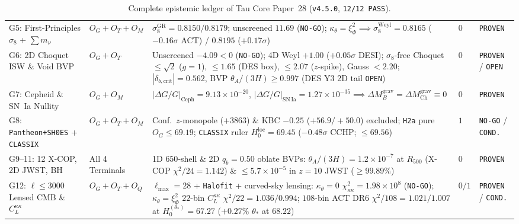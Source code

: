 \documentclass[11pt,a4paper]{article}
\begin{document}
\begin{table}[htbp]
{\begin{tabular}{ll>{\raggedright\arraybackslash}p{6.0cm}ll}
G5: First-Principles $\sigma_8$ + $\sum m_\nu$ & $O_G + O_T + O_M$ & $\sigma_8^{\mathrm{GR}} = 0.8150 / 0.8179$; unscreened $11.69$ ({\upshape\texttt{NO-GO}}); $\kappa_\theta = \xi_\Phi^2 \implies \sigma_8^{\mathrm{Weyl}} = 0.8165$ ($-0.16\sigma$ ACT) / $0.8195$ ($+0.17\sigma$) & $0$ & {\upshape\texttt{PROVEN}} \\
G6: 2D Choquet ISW \& Void BVP & $O_G + O_T$ & Unscreened $-4.09 < 0$ ({\upshape\texttt{NO-GO}}); 4D Weyl $+1.00$ ($+0.05\sigma$ DESI); $\sigma_8$-free Choquet $\le \sqrt{2}$ ($g{=}1$), $\le 1.65$ (DES box), $\le 2.07$ ($z$-spike), Gauss $< 2.20$; $|\delta_{b,\mathrm{crit}}| = 0.562$, BVP $\theta_A/(3H) \ge 0.997$ (DES Y3 2D tail {\upshape\texttt{OPEN}}) & $0$ & {\upshape\texttt{PROVEN}} / {\upshape\texttt{OPEN}} \\
G7: Cepheid \& SN~Ia Nullity & $O_G + O_M$ & $|\Delta G/G|_{\mathrm{Ceph}} = 9.13\times 10^{-20}$, $|\Delta G/G|_{\mathrm{SN\,Ia}} = 1.27\times 10^{-35} \implies \Delta M_B^{\mathrm{grav}} = \Delta M_{\mathrm{Ch}}^{\mathrm{grav}} \equiv 0$ & $0$ & {\upshape\texttt{PROVEN}} \\
G8: \texttt{Pantheon+SH0ES} + \texttt{CLASSIX} & $O_G + O_T + O_M$ & Conf.\ $z$-monopole ($+3863$) \& KBC $-0.25$ ($+56.9 / +50.0$) excluded; \texttt{H2a} pure $O_G \le 69.19$; \texttt{CLASSIX} ruler $H_0^{\mathrm{loc}} = 69.45$ ($-0.48\sigma$ CCHP; $\le 69.56$) & $1$ & {\upshape\texttt{NO-GO}} / {\upshape\texttt{COND.}} \\
G9--11: 12 X-COP, 2D JWST, BH & All 4 Terminals & 1D $650$-shell \& 2D $q_b = 0.50$ oblate BVPs: $\theta_A/(3H) = 1.2\times 10^{-7}$ at $R_{500}$ (X-COP $\chi^2/24 = 1.142$) \& $\le 5.7\times 10^{-5}$ in $z=10$ JWST ($\ge 99.89\%$) & $0$ & {\upshape\texttt{PROVEN}} \\
G12: $\ell \le 3000$ Lensed CMB \& $C_L^{\kappa\kappa}$ & $O_G + O_T + O_Q$ & $\ell_{\max}{=}28$ + \texttt{Halofit} + curved-sky lensing: $\kappa_\theta{=}0$ $\chi^2_{\kappa\kappa}{=}1.98{\times}10^8$ ({\upshape\texttt{NO-GO}}); $\kappa_\theta{=}\xi_\Phi^2$ $22$-bin $C_L^{\kappa\kappa}$ $\chi^2/22{=}1.036 / 0.994$; $108$-bin ACT DR6 $\chi^2/108{=}1.021 / 1.007$ at $H_0^{(\theta_*)}{=}67.27$ ($+0.27\%$ $\theta_*$ at $68.22$) & $0 / 1$ & {\upshape\texttt{PROVEN}} / {\upshape\texttt{COND.}} \\
\bottomrule
\end{tabular}%
}
\caption{Complete epistemic ledger of Tau Core Paper~28 (\texttt{v4.5.0}, \texttt{12/12 PASS}).}
\label{tab:epistemic-ledger}
\end{table}
\end{document}
